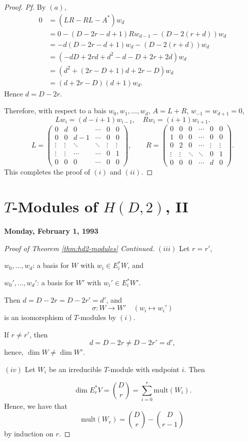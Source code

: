 \documentclass[
]{book}
\theoremstyle{definition}
\theoremstyle{definition}
\theoremstyle{definition}
\theoremstyle{definition}
\theoremstyle{remark}
\begin{document}
\begin{proof}
\emph{Pf.}
By \((a)\),
\begin{align}
0 & = (LR - RL - A^*)w_d \\
& = 0 - (D-2r-d+1)Rw_{d-1} - (D-2(r+d))w_d\\
& = -d(D-2r-d+1)w_d - (D-2(r+d))w_d\\
& = (-dD + 2rd + d^2 - d - D + 2r + 2d)w_d\\
& = (d^2 + (2r-D+1)d + 2r - D)w_d\\
& = (d+2r-D)(d+1)w_d.
\end{align}
Hence \(d = D-2r\).

Therefore, with respect to a bais \(w_0, w_1, \ldots, w_d\),
\(A = L+R\), \(w_{-1} = w_{d+1} = 0\),
\[Lw_i = (d-i+1)w_{i-1}, \quad Rw_i = (i+1)w_{i+1}.\]
\[L = \begin{pmatrix} 0 & d & 0 & \cdots & 0 & 0\\
0 & 0 & d-1 & \cdots & 0 & 0\\
\vdots & \vdots & \ddots & \ddots & \vdots & \vdots \\
\vdots & \vdots & \cdots & \cdots & 0 & 1\\
0 & 0 & 0 & \cdots & 0 & 0
\end{pmatrix}, \qquad 
R = \begin{pmatrix} 0 & 0 & 0 & \cdots & 0 & 0\\
1 & 0 & 0 & \cdots & 0 & 0\\
0 & 2 & 0 & \cdots & \vdots & \vdots\\
\vdots & \vdots & \ddots  & \ddots & 0 & 1\\
0 & 0 & 0 & \cdots & d & 0
\end{pmatrix}.\]
This completes the proof of \((i)\) and \((ii)\).
\end{proof}

\hypertarget{lec6}{%
\chapter{\texorpdfstring{\(T\)-Modules of \(H(D,2)\), II}{T-Modules of H(D,2), II}}\label{lec6}}

\textbf{Monday, February 1, 1993}

\begin{proof}[Proof of Theorem \ref{thm:hd2-modules} Continued]
\leavevmode

\((iii)\) Let \(r = r'\),

\(w_0,\ldots, w_d\): a basis for \(W\) with \(w_i\in E^*_iW\), and

\(w_0', \ldots, w_d'\): a basis for \(W'\) with \(w_i'\in E^*_iW'\).

Then \(d = D-2r = D-2r' = d'\), and
\[\sigma: W \to W' \quad (w_i\mapsto w_i')\]
is an isomorsphism of \(T\)-modules by \((i)\).

If \(r\neq r'\), then
\[d = D-2r \neq D-2r' = d',\]
hence, \(\dim W \neq \dim W'\).

\((iv)\) Let \(W_i\) be an irreducible \(T\)-module with endpoint \(i\). Then

\[\dim E_r^*V = \binom{D}{r} = \sum_{i=0}^r \mathrm{mult}(W_i).\]
Hence, we have that
\[\mathrm{mult}(W_r) = \binom{D}{r} - \binom{D}{r-1}\]
by induction on \(r\).

\end{proof}
\end{document}
